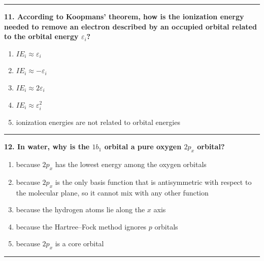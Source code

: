 \documentclass[
  english,
  9pt,
]{extbook}
\providecommand{\tightlist}{%
  \setlength{\itemsep}{0pt}\setlength{\parskip}{0pt}}
\theoremstyle{definition}
\theoremstyle{definition}
\theoremstyle{definition}
\theoremstyle{definition}
\theoremstyle{remark}
\begin{document}
\begin{center}\rule{0.5\linewidth}{0.5pt}\end{center}

\textbf{11. According to Koopmans' theorem, how is the ionization energy needed to remove an electron described by an occupied orbital related to the orbital energy \(\varepsilon_i\)?}

\begin{enumerate}
\def\labelenumi{\alph{enumi}.}
\tightlist
\item
  \(IE_i \approx \varepsilon_i\)\\
\item
  \(IE_i \approx -\varepsilon_i\)\\
\item
  \(IE_i \approx 2\varepsilon_i\)\\
\item
  \(IE_i \approx \varepsilon_i^2\)\\
\item
  ionization energies are not related to orbital energies
\end{enumerate}

\begin{center}\rule{0.5\linewidth}{0.5pt}\end{center}

\textbf{12. In water, why is the \(1b_1\) orbital a pure oxygen \(2p_x\) orbital?}

\begin{enumerate}
\def\labelenumi{\alph{enumi}.}
\tightlist
\item
  because \(2p_x\) has the lowest energy among the oxygen orbitals\\
\item
  because \(2p_x\) is the only basis function that is antisymmetric with respect to the molecular plane, so it cannot mix with any other function\\
\item
  because the hydrogen atoms lie along the \(x\) axis\\
\item
  because the Hartree--Fock method ignores \(p\) orbitals\\
\item
  because \(2p_x\) is a core orbital
\end{enumerate}

\begin{center}\rule{0.5\linewidth}{0.5pt}\end{center}
\end{document}

